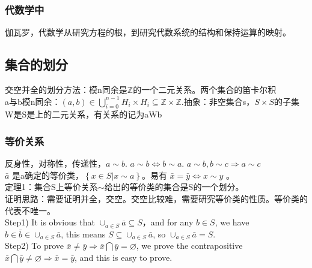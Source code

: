 \subsubsection{代数学中}
伽瓦罗，代数学从研究方程的根，到研究代数系统的结构和保持运算的映射。

\subsection{集合的划分}
交空并全的划分方法：模n同余是$\mathbb Z$的一个二元关系。两个集合的笛卡尔积\\
a与b模n同余：$(a,b) \in \bigcup _{i=0}^{n-1} H_i \times H_i \subseteq \mathbb Z \times \mathbb Z$.抽象：非空集合s，$S\times S$的子集W是S是上的二元关系，有关系的记为aWb\\

\subsubsection{等价关系}
反身性，对称性，传递性，$a \sim b$. $a \sim b \Leftrightarrow b \sim a$. $a \sim b , b \sim c \Rightarrow a \sim c$\\
$\bar a$ 是a确定的等价类，$\left\{ x \in S |x \sim a \right\}$。易有
$\bar x = \bar y \Leftrightarrow x \sim y$ 。\\


定理1：集合S上等价关系$\sim$给出的等价类的集合是S的一个划分。\\
证明思路：需要证明并全，交空。交空比较难，需要研究等价类的性质。等价类的代表不唯一。\\
Step1)  It is obvious that $\cup _{a \in S} {\bar a} \subseteq S$，and for any $b \in S$, we have $b \in \bar b \in \cup _{a \in S} {\bar a}$, this means $S \subseteq \cup _{a \in S} {\bar a}  $, so $ \cup _{a \in S} {\bar a} =S $.\\
Step2) To prove $\bar x \neq \bar y \Rightarrow \bar x \bigcap \bar y = \varnothing  $, we prove the contrapositive $ \bar x \bigcap \bar y \neq \varnothing \Rightarrow  \bar x = \bar y$, and this is easy to prove.\\



